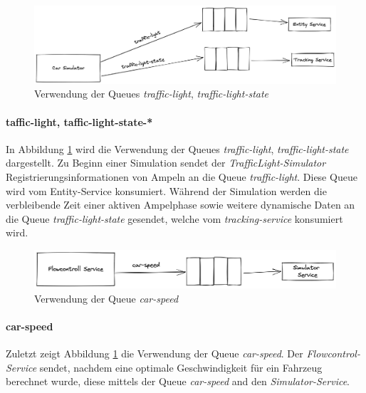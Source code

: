 \begin{figure}[h]
	\centering
	\includegraphics[width=1\textwidth]{./figures/traffic-light_simulator_mom.png}
	\caption{Verwendung der Queues \textit{traffic-light}, \textit{traffic-light-state} }
	\label{fig:light_simulator_mom}
\end{figure}

\paragraph{taffic-light, taffic-light-state-*}

In Abbildung \ref{fig:light_simulator_mom} wird die Verwendung der Queues \textit{traffic-light}, \textit{traffic-light-state} dargestellt.
Zu Beginn einer Simulation sendet der \textit{TrafficLight-Simulator} Registrierungsinformationen von Ampeln an die Queue \textit{traffic-light}.
Diese Queue wird vom Entity-Service konsumiert.
Während der Simulation werden die verbleibende Zeit einer aktiven Ampelphase sowie weitere dynamische Daten an die Queue \textit{traffic-light-state} gesendet, welche vom \textit{tracking-service} konsumiert wird.

\begin{figure}[h]
	\centering
	\includegraphics[width=1\textwidth]{./figures/flow_controll_speed_mom.png}
	\caption{Verwendung der Queue \textit{car-speed}}
	\label{fig:car_speed_mom}
\end{figure}

\paragraph{car-speed}

Zuletzt zeigt Abbildung \ref{fig:light_simulator_mom} die Verwendung der Queue \textit{car-speed}.
Der \textit{Flowcontrol-Service} sendet, nachdem eine optimale Geschwindigkeit für ein Fahrzeug berechnet wurde, diese mittels der Queue \textit{car-speed} and den \textit{Simulator-Service}.
